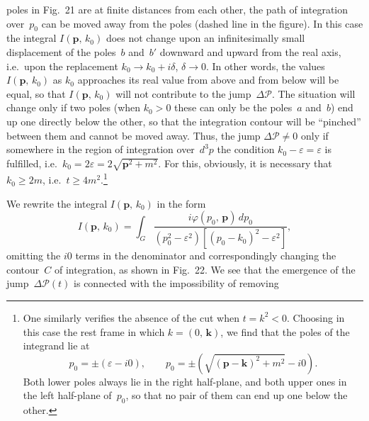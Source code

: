 \noindent poles in Fig.~21 are at finite distances from each other, the path of integration over~$p_0$ can be moved away from the poles (dashed line in the figure). In this case the integral $I(\mathbf{p},\,k_0)$ does not change upon an infinitesimally small displacement of the poles~$b$ and~$b'$ downward and upward from the real axis, i.e.\ upon the replacement $k_0 \to k_0 + i\delta$, $\delta \to 0$. In other words, the values $I(\mathbf{p},\,k_0)$ as $k_0$ approaches its real value from above and from below will be equal, so that $I(\mathbf{p},\,k_0)$ will not contribute to the jump~$\Delta\mathcal{P}$. The situation will change only if two poles (when $k_0 > 0$ these can only be the poles~$a$ and~$b$) end up one directly below the other, so that the integration contour will be ``pinched'' between them and cannot be moved away. Thus, the jump $\Delta\mathcal{P} \neq 0$ only if somewhere in the region of integration over~$d^3p$ the condition $k_0 - \varepsilon = \varepsilon$ is fulfilled, i.e.\ $k_0 = 2\varepsilon = 2\sqrt{\mathbf{p}^2 + m^2}$. For this, obviously, it is necessary that $k_0 \geqslant 2m$, i.e.\ $t \geqslant 4m^2$.\footnote{One similarly verifies the absence of the cut when $t = k^2 < 0$. Choosing in this case the rest frame in which $k = (0,\,\mathbf{k})$, we find that the poles of the integrand lie at
\[
p_0 = \pm(\varepsilon - i0), \qquad p_0 = \pm(\sqrt{(\mathbf{p} - \mathbf{k})^2 + m^2} - i0).
\]
Both lower poles always lie in the right half-plane, and both upper ones in the left half-plane of~$p_0$, so that no pair of them can end up one below the other.}

We rewrite the integral $I(\mathbf{p},\,k_0)$ in the form
\begin{equation}
I(\mathbf{p},\,k_0) = \int_G \frac{i\varphi(p_0,\,\mathbf{p})\,dp_0}{(p_0^2 - \varepsilon^2)[(p_0 - k_0)^2 - \varepsilon^2]},
\label{eq:115.5}
\end{equation}
omitting the $i0$ terms in the denominator and correspondingly changing the contour~$C$ of integration, as shown in Fig.~22. We see that the emergence of the jump~$\Delta\mathcal{P}(t)$ is connected with the impossibility of removing

\par\noindent

